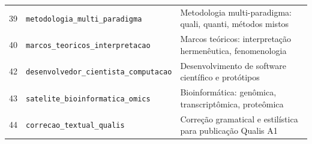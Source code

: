 \begin{longtable}{p{0.8cm} p{4.5cm} p{10cm}}
39 & \texttt{metodologia\_multi\_paradigma} & Metodologia multi-paradigma: quali, quanti, métodos mistos \\
40 & \texttt{marcos\_teoricos\_interpretacao} & Marcos teóricos: interpretação hermenêutica, fenomenologia \\
42 & \texttt{desenvolvedor\_cientista\_computacao} & Desenvolvimento de software científico e protótipos \\
43 & \texttt{satelite\_bioinformatica\_omics} & Bioinformática: genômica, transcriptômica, proteômica \\
44 & \texttt{correcao\_textual\_qualis} & Correção gramatical e estilística para publicação Qualis A1 \\
\bottomrule
\end{longtable}


